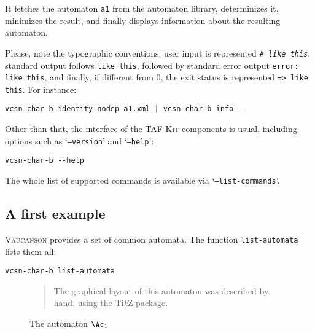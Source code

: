 \documentclass[a4paper]{report}
\def\tikzname{Ti\emph{k}Z\xspace}
\newcommand{\Index}[1]{\index{#1}#1}
\newenvironment{legend}{%
  \begin{quote}%
    }{%
  \end{quote}%
}
\newcommand\kbd[1]{\textsl{\texttt{#1}}}
\newcommand\code[1]{\texttt{#1}}
\newcommand\option[1]{`\texttt{#1}'}
\newcommand{\taffn}[1]{\code{#1}}
\newcommand{\tafkit}{\textsc{TAF-Kit}\xspace}
\newcommand{\Vauc}{\textsc{Vaucanson}\xspace}
\begin{document}
\noindent
It fetches the automaton \code{a1} from the automaton library,
determinizes it, minimizes the result, and finally displays
information about the resulting automaton.

Please, note the typographic conventions: user input is represented
\texttt{\# \kbd{like this}}, standard output follows \texttt{like
  this}, followed by standard error output \texttt{error: like this},
and finally, if different from 0, the exit status is represented
\texttt{=> like this}.  For instance:

\begin{verbatim}
vcsn-char-b identity-nodep a1.xml | vcsn-char-b info -
\end{verbatim}

\smallskip

Other than that, the interface of the \tafkit components is usual,
including options such as \option{--version} and \option{--help}:

\begin{verbatim}
vcsn-char-b --help
\end{verbatim}

The whole list of supported commands is available via
\option{--list-commands}.

\subsection{A first example}

\Vauc provides a set of common automata.  The function
\Index{\taffn{list-automata}} lists them all:

\begin{verbatim}
vcsn-char-b list-automata
\end{verbatim}

\begin{figure}[ht] \centering
  \begin{legend}
    The graphical layout of this automaton was described by hand,
    using the \tikzname package.
  \end{legend}
  \caption{The automaton $\Ac_1$}
  \label{fig:a1}
\end{figure}
\end{document}
